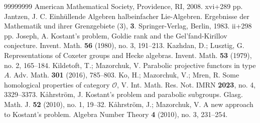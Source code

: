 \documentclass[a4paper]{amsart}
\begin{document}
\begin{thebibliography}{99999999}
American Mathematical Society, Providence, RI, 2008. xvi+289 pp.
 Jantzen, J. C. Einh{\"u}llende Algebren halbeinfacher 
Lie-Algebren. Ergebnisse der Mathematik und ihrer Grenzgebiete (3), 
{\bf 3}. Springer-Verlag, Berlin, 1983. ii+298 pp. 
 Joseph, A. Kostant's problem, Goldie rank and the 
Gel'fand-Kirillov conjecture. Invent. Math. {\bf 56} (1980), no. 3,  191--213.
 Kazhdan, D.; Lusztig, G. Representations of Coxeter groups 
and Hecke algebras. Invent. Math. {\bf 53} (1979), no. 2, 165--184.
 Kildetoft, T.; Mazorchuk, V. Parabolic projective 
functors in type $A$. Adv. Math. {\bf 301} (2016), 785--803.
Ko, H.; Mazorchuk, V.; Mr{\dj}en, R.
Some homological properties of category $\mathcal{O}$, V.
Int. Math. Res. Not. IMRN {\bf 2023}, no. 4, 3329--3373.
 K{\aa}hrstr{\"o}m, J. Kostant's problem and parabolic 
subgroups. Glasg. Math. J. {\bf 52} (2010), no. 1, 19--32.
 K{\aa}hrstr{\"o}m, J.; Mazorchuk, V. A new approach to 
Kostant's problem. Algebra Number Theory {\bf 4} (2010), no. 3, 231--254.

\end{thebibliography}
\end{document}
